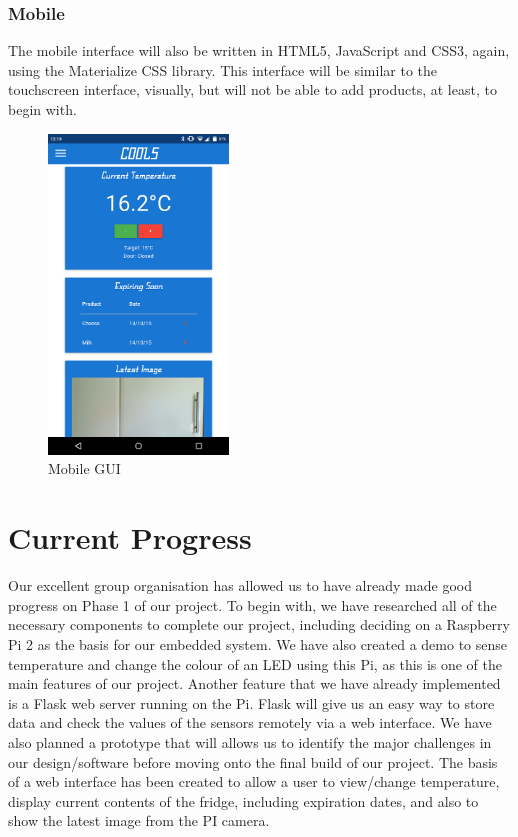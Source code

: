 \documentclass[10pt]{article}
\begin{document}
\subsubsection{Mobile}

The mobile interface will also be written in HTML5, JavaScript and CSS3, again, using the Materialize CSS library. This interface will be similar to the touchscreen interface, visually, but will not be able to add products, at least, to begin with.

\begin{figure}[h]
\centering
\caption{Mobile GUI}
\label{Mobile GUI}
\includegraphics[height=8.5cm]{images/Mobile-Screenshot.png}
\end{figure}

\newpage
\section{Current Progress}

Our excellent group organisation has allowed us to have already made good progress on Phase 1 of our project. To begin with, we have researched all of the necessary components to complete our project, including deciding on a Raspberry Pi 2 as the basis for our embedded system. We have also created a demo to sense temperature and change the colour of an LED using this Pi, as this is one of the main features of our project. Another feature that we have already implemented is a Flask web server running on the Pi. Flask will give us an easy way to store data and check the values of the sensors remotely via a web interface. We have also planned a prototype that will allows us to identify the major challenges in our design/software before moving onto the final build of our project. The basis of a web interface has been created to allow a user to view/change temperature, display current contents of the fridge, including expiration dates, and also to show the latest image from the PI camera.
\end{document}
